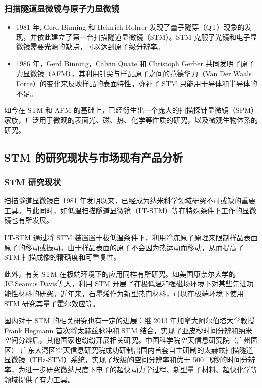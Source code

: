\documentclass[zihao=-4]{ctexart}
\newcommand{\setParDis}{\setlength {\parskip} {0pt} }
\begin{document}
\begin{spacing}{1.5}
		
		
		\subsubsection[扫描隧道显微镜与原子力显微镜]{扫描隧道显微镜与原子力显微镜}
			\begin{itemize}
				\item 1981 年, Gerd Binning 和 Heinrich Rohrer 发现了量子隧穿（QT）现象的发现，并依此建立了第一台扫描隧道显微镜（STM）。STM 克服了光镜和电子显微镜需要光源的缺点，可以达到原子级分辨率。
				\item 1986 年，Gerd Binning，Calvin Quate 和 Christoph Gerber 共同发明了原子力显微镜（AFM），其利用针尖与样品原子之间的范德华力（Van Der Waals Force）的变化来反映样品的表面特性，弥补了 STM 只能用于导体和半导体的不足。
			\end{itemize}
			
			如今在 STM 和 AFM 的基础上，已经衍生出一个庞大的扫描探针显微镜（SPM）家族，广泛用于微观的表面光、磁、热、化学等性质的研究，以及微观生物体系的研究。

		
	\subsection{STM 的研究现状与市场现有产品分析}
		\subsubsection[STM 研究现状]{STM 研究现状}
		扫描隧道显微镜自 1981 年发明以来，已经成为纳米科学领域研究不可或缺的重要工具。与此同时，如低温扫描隧道显微镜（LT-STM）等在特殊条件下工作的显微镜也有所发展\cite{ref5,ref6,ref7}。
		
		LT-STM 通过将 STM 装置置于极低温条件下，利用冷冻原子原理来限制样品表面原子的移动或振动。由于样品表面的原子不会因为热运动而移动，从而提高了 STM 扫描成像的精确度和可重复性\cite{ref8}。
		
		此外，有关 STM 在极端环境下的应用同样有所研究\cite{ref1,ref2,ref3}。如美国康奈尔大学的 JC.Seamus Davis等人\cite{ref4}，利用 STM 开展了在极低温和强磁场环境下对某些先进功能性材料的研究。近年来，石墨烯作为新型热门材料，可以在极端环境下使用 STM 研究其量子霍尔效应等。
		
		国内对于 STM 的相关研究也有一定的进展：继 2013 年加拿大阿尔伯塔大学教授 Frank Hegmann 首次将太赫兹脉冲和 STM 结合，实现了亚皮秒时间分辨和纳米空间分辨后，其他国家也纷纷开展相关研究。中国科学院空天信息研究院（广州园区）-广东大湾区空天信息研究院成功研制出国内首套自主研制的太赫兹扫描隧道显微镜（THz-STM）系统，实现了埃级的空间分辨率和优于 500 飞秒的时间分辨率，为进一步研究微纳尺度下电子的超快动力学过程、新型量子材料、超快化学等领域提供了有力工具\cite{ref9}。
		

\end{spacing}
\end{document}

